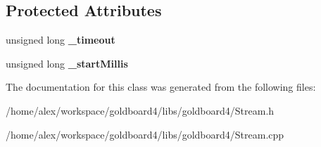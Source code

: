 \subsection*{Protected Attributes}
\begin{DoxyCompactItemize}
\item 
unsigned long {\bfseries \+\_\+timeout}\hypertarget{class_stream_aae48f1a926d2e82a452f2c75af0c6a29}{}\label{class_stream_aae48f1a926d2e82a452f2c75af0c6a29}

\item 
unsigned long {\bfseries \+\_\+start\+Millis}\hypertarget{class_stream_abf61d2006d28d18f2e028285a323fe5a}{}\label{class_stream_abf61d2006d28d18f2e028285a323fe5a}

\end{DoxyCompactItemize}


The documentation for this class was generated from the following files\+:\begin{DoxyCompactItemize}
\item 
/home/alex/workspace/goldboard4/libs/goldboard4/Stream.\+h\item 
/home/alex/workspace/goldboard4/libs/goldboard4/Stream.\+cpp\end{DoxyCompactItemize}
